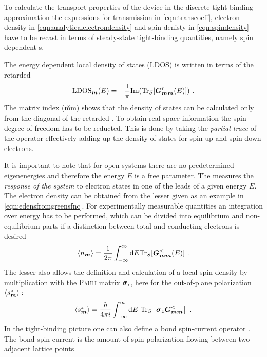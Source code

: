 To calculate the transport properties of the device in the discrete tight binding approximation the expressions for transmission in \cref{eqn:transcoeff}, electron density in \cref{eqn:analyticalelectrondensity} and spin denisty in \cref{eqn:spindensity} have to be recast in terms of steady-state tight-binding quantities, namely spin dependent \gfnc s.\par
The energy dependent local density of states (LDOS) is written in terms of the retarded \gfnc{} \cite{AnLunNik2008}
\begin{align}
\text{LDOS}_{\boldsymbol{m}}(E)=-\frac{1}{\pi} \text{Im}(\text{Tr}_S[\boldsymbol{G}_{\boldsymbol{mm}}^r(E)]) \ .
\label{eqn:ldos}
\end{align}
The matrix index (\v{mm}) shows that the density of states can be calculated only from the diagonal of the retarded \gfnc{}.
To obtain real space information the spin degree of freedom has to be reducted. This is done by taking the \emph{partial trace} \cite{Jacobs} of the operator effectively adding up the density of states for spin up and spin down electrons.\par
It is important to note that for open systems there are no predetermined eigenenergies and therefore the energy $E$ is a free parameter. The \gfnc{} measures the \emph{response of the system} to electron states in one of the leads of a given energy $E$. The electron density can be obtained from the lesser \gfnc{} given as an example in \cref{eqn:edensfromgreensfnc}. For experimentally measurable quantities an integration over energy has to be performed, which can be divided into equilibrium and non-equilibrium parts if a distinction between total and conducting electrons is desired
\begin{align}
	\expv{n_{\v{m}}} = \frac{1}{2\pi} \int_{-\infty}^{\infty}\text{d}E\text{Tr}_S[\mat{G}_{\v{mm}}^<(E)] \ .
	\label{eqn:gfncdensity}
\end{align}
The lesser \gfnc{} also allows the definition and calculation  of a local spin density by multiplication with the \textsc{Pauli} matrix $\boldsymbol{\sigma}_i$, here for the out-of-plane polarization $\left< s^z_{\boldsymbol{m}} \right>$\,\cite{Wimmer2009Thesis}:
\begin{align}
\left< s^z_{\boldsymbol{m}} \right> = \frac{\hbar}{4 \pi i} \int^{\infty}_{-\infty}\text{d}E\text{ Tr}_S\left[\boldsymbol{\sigma}_z\boldsymbol{G}^<_{\boldsymbol{mm}}\right]\ .
\label{eqn:gfncspindensity}
\end{align}
In the tight-binding picture one can also define a bond spin-current operator \cite{EPL.80.47001}. The bond spin current is the amount of spin polarization flowing between two adjacent lattice points
